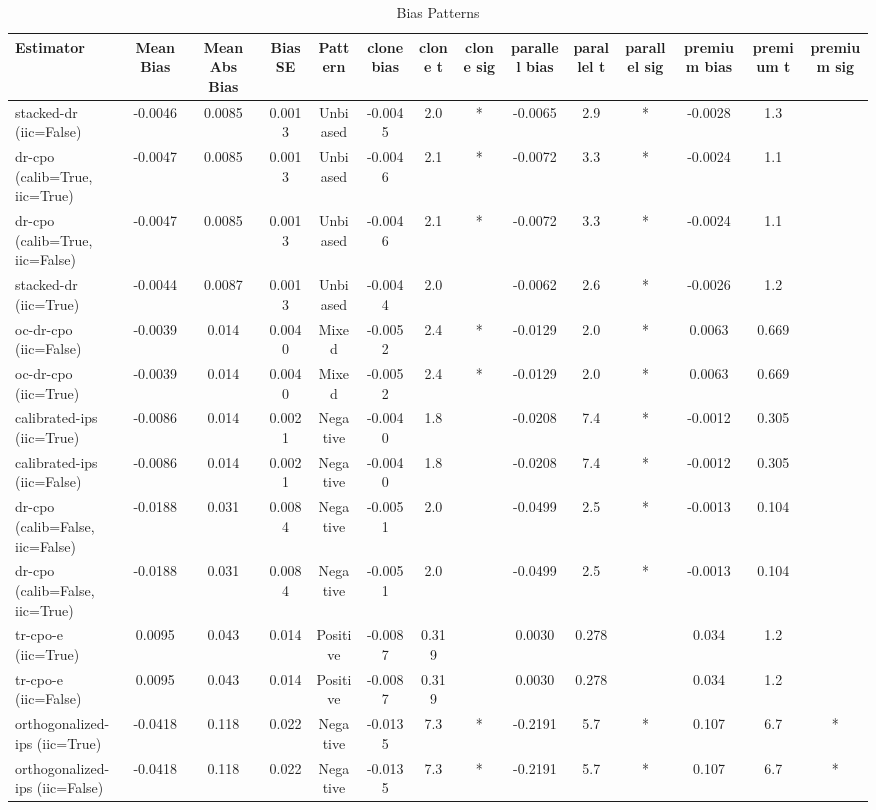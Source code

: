 \begin{table}[htbp]
\centering
\caption{Bias Patterns}
\label{tab:A2}
\begin{tabular}{l|ccccccccccccc}
\toprule
Estimator & Mean Bias & Mean Abs Bias & Bias SE & Pattern & clone bias & clone t & clone sig & parallel bias & parallel t & parallel sig & premium bias & premium t & premium sig \\
\midrule
stacked-dr (iic=False) & -0.0046 & 0.0085 & 0.0013 & Unbiased & -0.0045 & 2.0 & * & -0.0065 & 2.9 & * & -0.0028 & 1.3 &  \\
dr-cpo (calib=True, iic=True) & -0.0047 & 0.0085 & 0.0013 & Unbiased & -0.0046 & 2.1 & * & -0.0072 & 3.3 & * & -0.0024 & 1.1 &  \\
dr-cpo (calib=True, iic=False) & -0.0047 & 0.0085 & 0.0013 & Unbiased & -0.0046 & 2.1 & * & -0.0072 & 3.3 & * & -0.0024 & 1.1 &  \\
stacked-dr (iic=True) & -0.0044 & 0.0087 & 0.0013 & Unbiased & -0.0044 & 2.0 &  & -0.0062 & 2.6 & * & -0.0026 & 1.2 &  \\
oc-dr-cpo (iic=False) & -0.0039 & 0.014 & 0.0040 & Mixed & -0.0052 & 2.4 & * & -0.0129 & 2.0 & * & 0.0063 & 0.669 &  \\
oc-dr-cpo (iic=True) & -0.0039 & 0.014 & 0.0040 & Mixed & -0.0052 & 2.4 & * & -0.0129 & 2.0 & * & 0.0063 & 0.669 &  \\
calibrated-ips (iic=True) & -0.0086 & 0.014 & 0.0021 & Negative & -0.0040 & 1.8 &  & -0.0208 & 7.4 & * & -0.0012 & 0.305 &  \\
calibrated-ips (iic=False) & -0.0086 & 0.014 & 0.0021 & Negative & -0.0040 & 1.8 &  & -0.0208 & 7.4 & * & -0.0012 & 0.305 &  \\
dr-cpo (calib=False, iic=False) & -0.0188 & 0.031 & 0.0084 & Negative & -0.0051 & 2.0 &  & -0.0499 & 2.5 & * & -0.0013 & 0.104 &  \\
dr-cpo (calib=False, iic=True) & -0.0188 & 0.031 & 0.0084 & Negative & -0.0051 & 2.0 &  & -0.0499 & 2.5 & * & -0.0013 & 0.104 &  \\
tr-cpo-e (iic=True) & 0.0095 & 0.043 & 0.014 & Positive & -0.0087 & 0.319 &  & 0.0030 & 0.278 &  & 0.034 & 1.2 &  \\
tr-cpo-e (iic=False) & 0.0095 & 0.043 & 0.014 & Positive & -0.0087 & 0.319 &  & 0.0030 & 0.278 &  & 0.034 & 1.2 &  \\
orthogonalized-ips (iic=True) & -0.0418 & 0.118 & 0.022 & Negative & -0.0135 & 7.3 & * & -0.2191 & 5.7 & * & 0.107 & 6.7 & * \\
orthogonalized-ips (iic=False) & -0.0418 & 0.118 & 0.022 & Negative & -0.0135 & 7.3 & * & -0.2191 & 5.7 & * & 0.107 & 6.7 & * \\

\end{tabular}
\end{table}
